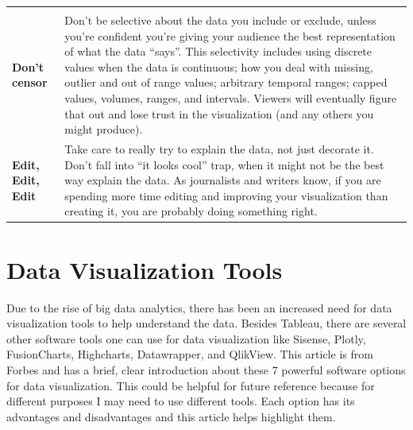 \documentclass[]{book}
\begin{document}
\begin{longtable}[]{@{}ll@{}}
\begin{minipage}[t]{0.75\columnwidth}
\end{minipage}\tabularnewline
\begin{minipage}[t]{0.19\columnwidth}\raggedright
\textbf{Don't censor}\strut
\end{minipage} & \begin{minipage}[t]{0.75\columnwidth}\raggedright
Don't be selective about the data you include or exclude, unless you're confident you're giving your audience the best representation of what the data ``says''. This selectivity includes using discrete values when the data is continuous; how you deal with missing, outlier and out of range values; arbitrary temporal ranges; capped values, volumes, ranges, and intervals. Viewers will eventually figure that out and lose trust in the visualization (and any others you might produce).\strut
\end{minipage}\tabularnewline
\begin{minipage}[t]{0.19\columnwidth}\raggedright
\textbf{Edit, Edit, Edit}\strut
\end{minipage} & \begin{minipage}[t]{0.75\columnwidth}\raggedright
Take care to really try to explain the data, not just decorate it. Don't fall into ``it looks cool'' trap, when it might not be the best way explain the data. As journalists and writers know, if you are spending more time editing and improving your visualization than creating it, you are probably doing something right.\strut
\end{minipage}\tabularnewline
\bottomrule
\end{longtable}

\hypertarget{data-visualization-tools}{%
\section{Data Visualization Tools}\label{data-visualization-tools}}

Due to the rise of big data analytics, there has been an increased need for data visualization tools to help understand the data. Besides Tableau, there are several other software tools one can use for data visualization like Sisense, Plotly, FusionCharts, Highcharts, Datawrapper, and QlikView. This article is from Forbes and has a brief, clear introduction about these 7 powerful software options for data visualization. This could be helpful for future reference because for different purposes I may need to use different tools. Each option has its advantages and disadvantages and this article helps highlight them.
\end{document}
